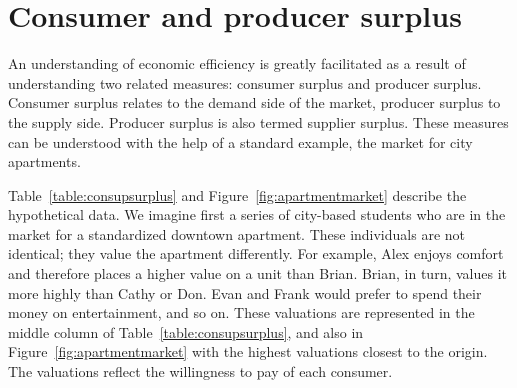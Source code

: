 \section{Consumer and producer surplus}\label{sec:ch5sec2}

An understanding of economic efficiency is greatly facilitated as a result of understanding two related measures: consumer surplus and producer surplus. Consumer surplus relates to the demand side of the market, producer surplus to the supply side. Producer surplus is also termed supplier surplus. These measures can be understood with the help of a standard example, the market for city apartments.

Table~\ref{table:consupsurplus} and Figure~\ref{fig:apartmentmarket} describe the hypothetical data. We imagine first a series of city-based students who are in the market for a standardized downtown apartment. These individuals are not identical; they value the apartment differently. For example, Alex enjoys comfort and therefore places a higher value on a unit than Brian. Brian, in turn, values it more highly than Cathy or Don. Evan and Frank would prefer to spend their money on entertainment, and so on. These valuations are represented in the middle column of Table~\ref{table:consupsurplus}, and also in Figure~\ref{fig:apartmentmarket} with the highest valuations closest to the origin. The valuations reflect the willingness to pay of each consumer.

